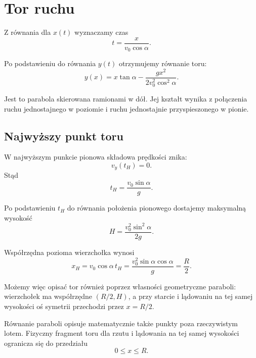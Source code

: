 \section{Tor ruchu}

Z równania dla \(x(t)\) wyznaczamy czas
\[
t=\frac{x}{v_0\cos\alpha}.
\]

Po podstawieniu do równania \(y(t)\) otrzymujemy równanie toru:
\[
y(x)=x\tan\alpha-\frac{g x^2}{2v_0^2\cos^2\alpha}.
\]

Jest to parabola skierowana ramionami w dół. Jej kształt wynika z połączenia
ruchu jednostajnego w poziomie i ruchu jednostajnie przyspieszonego w pionie.

\subsection{Najwyższy punkt toru}

W najwyższym punkcie pionowa składowa prędkości znika:
\[
v_y(t_H)=0.
\]
Stąd
\[
t_H=\frac{v_0\sin\alpha}{g}.
\]

Po podstawieniu \(t_H\) do równania położenia pionowego dostajemy maksymalną
wysokość
\[
H=\frac{v_0^2\sin^2\alpha}{2g}.
\]

Współrzędna pozioma wierzchołka wynosi
\[
x_H=v_0\cos\alpha\,t_H
   =\frac{v_0^2\sin\alpha\cos\alpha}{g}
   =\frac{R}{2}.
\]

Możemy więc opisać tor również poprzez własności geometryczne paraboli:
wierzchołek ma współrzędne \((R/2,H)\), a przy starcie i lądowaniu na tej
samej wysokości oś symetrii przechodzi przez \(x=R/2\).

Równanie paraboli opisuje matematycznie także punkty poza rzeczywistym lotem.
Fizyczny fragment toru dla rzutu i lądowania na tej samej wysokości ogranicza
się do przedziału
\[
0\le x\le R.
\]
